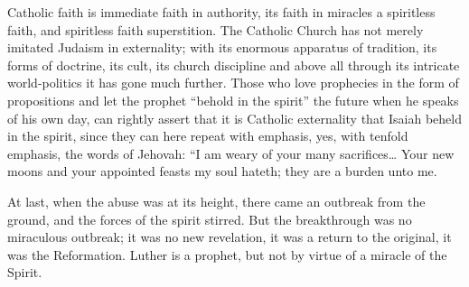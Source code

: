 \documentclass[12pt,a4paper,openany]{book}
\newcommand{\opage}[1]{\marginnote{\footnotesize\textit{[#1]}}}
\begin{document}
Catholic faith is immediate faith in authority,
its faith in miracles a spiritless faith, and spiritless faith
superstition. The Catholic Church has not merely imitated
Judaism in externality; with its enormous
apparatus of tradition, its forms of doctrine, its cult, its
church discipline and above all through its intricate world-politics
it has gone much further. Those who love prophecies
in the form of propositions and let the prophet ``behold in the spirit''
the future when he speaks of his own day, can
rightly assert that it is Catholic externality
that Isaiah beheld in the spirit, since they can here repeat
with emphasis, yes, with tenfold emphasis,
the words of Jehovah: ``I am weary of your many
sacrifices\dots{} Your new moons and your appointed feasts
my soul hateth; they are a burden unto me.

\setcounter{footnote}{0}%
\opage{73}At last, when the abuse was at its height, there came
an outbreak from the ground, and the forces of the spirit stirred.
But the breakthrough was no miraculous
outbreak; it was no new revelation, it was a return
to the original, it was the Reformation.
Luther is a prophet, but not by virtue of a miracle of the Spirit.
\end{document}
